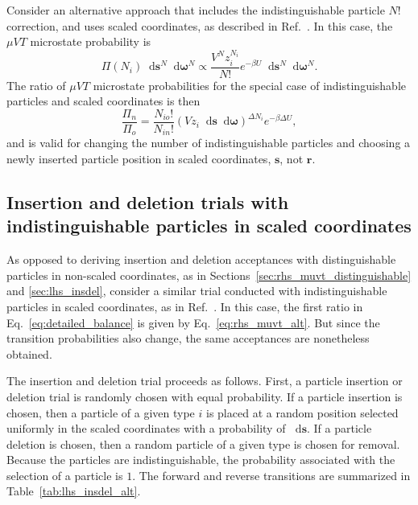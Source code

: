 \documentclass[
  9pt,
  bestpractices,
]{livecoms}
\newcommand*\diff{\mathop{}\!\mathrm{d}}
\begin{document}
Consider an alternative approach that includes the indistinguishable particle $N!$ correction, and uses scaled coordinates, as described in Ref.~\cite{frenkel_understanding_2002}.
In this case, the $\mu VT$ microstate probability is
\begin{equation}
\Pi(N_i)\diff\mathbf{s}^{N}\diff\boldsymbol{\omega}^{N} \propto \frac{V^{N}z_i^{N_i}}{N!} e^{-\beta U} \diff\mathbf{s}^{N}\diff\boldsymbol{\omega}^{N}.
\end{equation}
The ratio of $\mu VT$ microstate probabilities for the special case of indistinguishable particles and scaled coordinates is then
\begin{equation}
\frac{\Pi_n}{\Pi_o} = \frac{N_{io}!}{N_{in}!}\left(V z_i\diff\mathbf{s}\diff\boldsymbol{\omega}\right)^{\Delta N_i}e^{-\beta\Delta U},
\label{eq:rhs_muvt_alt}
\end{equation}
and is valid for changing the number of indistinguishable particles and choosing a newly inserted particle position in scaled coordinates, $\mathbf{s}$, not $\mathbf{r}$.


\subsection{\label{sec:lhs_insdel_alt}Insertion and deletion trials with indistinguishable particles in scaled coordinates}

As opposed to deriving insertion and deletion acceptances with distinguishable particles in non-scaled coordinates, as in Sections~\ref{sec:rhs_muvt_distinguishable} and \ref{sec:lhs_insdel}, consider a similar trial conducted with indistinguishable particles in scaled coordinates, as in Ref.~\cite{frenkel_understanding_2002}.
In this case, the first ratio in Eq.~\ref{eq:detailed_balance} is given by Eq.~\ref{eq:rhs_muvt_alt}.
But since the transition probabilities also change, the same acceptances are nonetheless obtained.

The insertion and deletion trial proceeds as follows.
First, a particle insertion or deletion trial is randomly chosen with equal probability.
If a particle insertion is chosen, then a particle of a given type $i$ is placed at a random position selected uniformly in the scaled coordinates with a probability of $\diff\mathbf{s}$.
If a particle deletion is chosen, then a random particle of a given type is chosen for removal.
Because the particles are indistinguishable, the probability associated with the selection of a particle is $1$.
The forward and reverse transitions are summarized in Table~\ref{tab:lhs_insdel_alt}.
\end{document}
